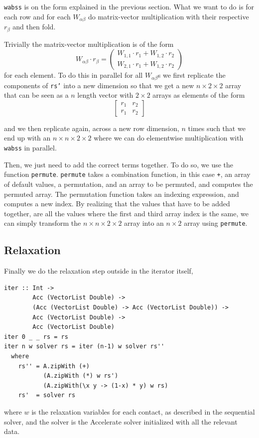 \documentclass[runningheads,a4paper]{llncs}
\begin{document}
\texttt{wabss} is on the form explained in the previous section.
What we want to do is for each row and for each $W_{\alpha\beta}$
do matrix-vector multiplication with their respective $r_\beta$
and then fold.

Trivially the matrix-vector multiplication is of the form
\[
W_{\alpha\beta} \cdot r_\beta = 
\begin{pmatrix}
W_{1,1} \cdot r_{1} + W_{1,2} \cdot r_{2} \\
W_{2,1} \cdot r_{1} + W_{1,2} \cdot r_{2}
\end{pmatrix}
\]
for each element.
To do this in parallel for all $W_{\alpha\beta}$s
we first replicate the components of \texttt{rs'}
into a new dimension so that we get a new $n \times 2 \times 2$
array that can be seen as a $n$ length vector with $2 \times 2$
arrays as elements of the form
\[
\begin{bmatrix}
r_{1} & r_{2} \\
r_{1} & r_{2}
\end{bmatrix}
\]

and we then replicate again, across a new row dimension,
$n$ times such that we end up with an $n \times n \times 2 \times 2$
where we can do elementwise multiplication with \texttt{wabss} in parallel.

Then, we just need to add the correct terms together. To do so, we use the
function \verb+permute+. \verb+permute+ takes a combination function, in this
case \verb-+-, an array of default values, a permutation, and an array to be
permuted, and computes the permuted array. The permutation function takes an
indexing expression, and computes a new index. By realizing that the values
that have to be added together, are all the values where the first and third
array index is the same, we can simply transform the $n \times n \times 2
\times 2$ array into an $n \times 2$ array using \verb+permute+.

\subsection{Relaxation}
Finally we do the relaxation step outside in the iterator itself,
\begin{verbatim}
iter :: Int ->
        Acc (VectorList Double) ->
        (Acc (VectorList Double) -> Acc (VectorList Double)) ->
        Acc (VectorList Double) ->
        Acc (VectorList Double)
iter 0 _ _ rs = rs
iter n w solver rs = iter (n-1) w solver rs''
  where
    rs'' = A.zipWith (+)
           (A.zipWith (*) w rs')
           (A.zipWith(\x y -> (1-x) * y) w rs)
    rs'  = solver rs
\end{verbatim}
where $w$ is the relaxation variables for each contact,
as described in the sequential solver,
and the solver is the Accelerate solver initialized
with all the relevant data.
\end{document}
